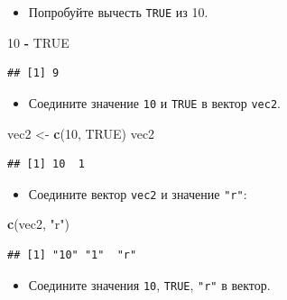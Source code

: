 \documentclass[]{book}
\newenvironment{Shaded}{\begin{snugshade}}{\end{snugshade}}
\newcommand{\KeywordTok}[1]{\textcolor[rgb]{0.13,0.29,0.53}{\textbf{#1}}}
\newcommand{\DecValTok}[1]{\textcolor[rgb]{0.00,0.00,0.81}{#1}}
\newcommand{\StringTok}[1]{\textcolor[rgb]{0.31,0.60,0.02}{#1}}
\newcommand{\OtherTok}[1]{\textcolor[rgb]{0.56,0.35,0.01}{#1}}
\newcommand{\OperatorTok}[1]{\textcolor[rgb]{0.81,0.36,0.00}{\textbf{#1}}}
\newcommand{\NormalTok}[1]{#1}
\providecommand{\tightlist}{%
  \setlength{\itemsep}{0pt}\setlength{\parskip}{0pt}}
\begin{document}
\begin{itemize}
\tightlist
\item
  Попробуйте вычесть \texttt{TRUE} из 10.
\end{itemize}

\begin{Shaded}
\begin{Highlighting}[]
\DecValTok{10} \OperatorTok{-}\StringTok{ }\OtherTok{TRUE}
\end{Highlighting}
\end{Shaded}

\begin{verbatim}
## [1] 9
\end{verbatim}

\begin{itemize}
\tightlist
\item
  Соедините значение \texttt{10} и \texttt{TRUE} в вектор \texttt{vec2}.
\end{itemize}

\begin{Shaded}
\begin{Highlighting}[]
\NormalTok{vec2 <-}\StringTok{ }\KeywordTok{c}\NormalTok{(}\DecValTok{10}\NormalTok{, }\OtherTok{TRUE}\NormalTok{)}
\NormalTok{vec2}
\end{Highlighting}
\end{Shaded}

\begin{verbatim}
## [1] 10  1
\end{verbatim}

\begin{itemize}
\tightlist
\item
  Соедините вектор \texttt{vec2} и значение \texttt{"r"}:
\end{itemize}

\begin{Shaded}
\begin{Highlighting}[]
\KeywordTok{c}\NormalTok{(vec2, }\StringTok{"r"}\NormalTok{)}
\end{Highlighting}
\end{Shaded}

\begin{verbatim}
## [1] "10" "1"  "r"
\end{verbatim}

\begin{itemize}
\tightlist
\item
  Соедините значения \texttt{10}, \texttt{TRUE}, \texttt{"r"} в вектор.
\end{itemize}
\end{document}
